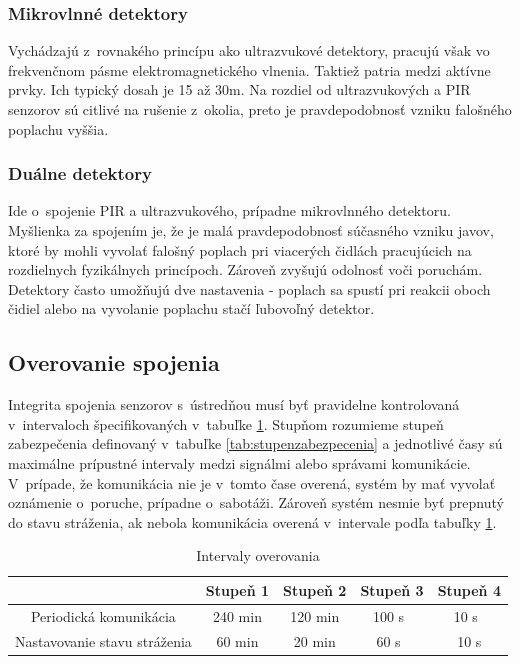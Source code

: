 \subsubsection{Mikrovlnné detektory}

Vychádzajú z~rovnakého princípu ako ultrazvukové detektory, pracujú však vo frekvenčnom pásme elektromagnetického vlnenia. Taktiež patria medzi aktívne prvky. Ich typický dosah je 15 až 30m. Na rozdiel od ultrazvukových a PIR senzorov sú citlivé na rušenie z~okolia, preto je pravdepodobnosť vzniku falošného poplachu vyššia.\cite{velas_ezs}

\subsubsection{Duálne detektory}

Ide o~spojenie PIR a ultrazvukového, prípadne mikrovlnného detektoru. Myšlienka za spojením je, že je malá pravdepodobnosť súčasného vzniku javov, ktoré by mohli vyvolať falošný poplach pri viacerých čidlách pracujúcich na rozdielnych fyzikálnych princípoch. Zároveň zvyšujú odolnosť voči poruchám. Detektory často umožňujú dve nastavenia - poplach sa spustí pri reakcii oboch čidiel alebo na vyvolanie poplachu stačí ľubovoľný detektor.\cite{velas_ezs}

\subsection{Overovanie spojenia}

Integrita spojenia senzorov s~ústredňou musí byť pravidelne kontrolovaná v~intervaloch špecifikovaných v~tabuľke \ref{tab:interval_overenia}. Stupňom rozumieme stupeň zabezpečenia definovaný v~tabuľke \ref{tab:stupenzabezpecenia} a jednotlivé časy sú maximálne prípustné intervaly medzi signálmi alebo správami komunikácie. V~prípade, že komunikácia nie je v~tomto čase overená, systém by mať vyvolať oznámenie o~poruche, prípadne o~sabotáži. Zároveň systém nesmie byť prepnutý do stavu stráženia, ak nebola komunikácia overená v~intervale podľa tabuľky \ref{tab:interval_overenia}.

\begin{table}[ht]
    \centering
    \renewcommand{\arraystretch}{1.5}
    \begin{tabular}{|c|c|c|c|c|}
        \hline
         & Stupeň 1 & Stupeň 2 & Stupeň 3 & Stupeň 4 \\ \hline
        Periodická komunikácia & 240 min & 120 min & 100 s~& 10 s~\\ \hline
        Nastavovanie stavu stráženia & 60 min & 20 min & 60 s~& 10 s\\ \hline
    \end{tabular}
    \caption[Intervaly overovania]{Intervaly overovania\cite{csn-en-50131-1}}
    \label{tab:interval_overenia}
\end{table}



